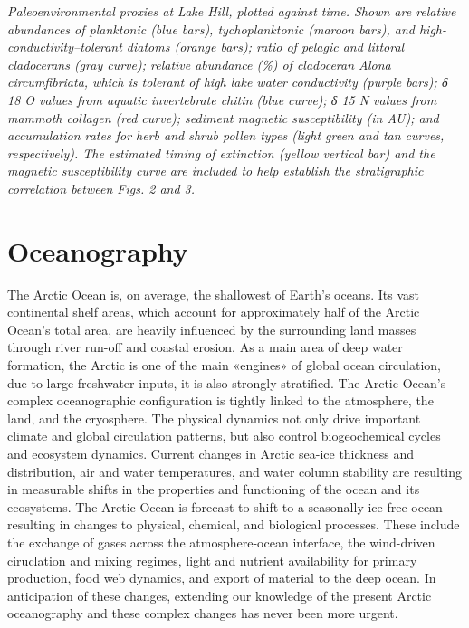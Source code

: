\documentclass[]{book}
\begin{document}
\emph{Paleoenvironmental proxies at Lake Hill, plotted against time. Shown are relative abundances of planktonic (blue bars), tychoplanktonic (maroon bars), and high-conductivity--tolerant diatoms (orange bars); ratio of pelagic and littoral cladocerans (gray curve); relative abundance (\%) of cladoceran Alona circumfibriata, which is tolerant of high lake water conductivity (purple bars); δ 18 O values from aquatic invertebrate chitin (blue curve); δ 15 N values from mammoth collagen (red curve); sediment magnetic susceptibility (in AU); and accumulation rates for herb and shrub pollen types (light green and tan curves, respectively). The estimated timing of extinction (yellow vertical bar) and the magnetic susceptibility curve are included to help establish the stratigraphic correlation between Figs. 2 and 3. }

\hypertarget{flowers}{%
\chapter*{Oceanography}\label{flowers}}

The Arctic Ocean is, on average, the shallowest of Earth's oceans. Its vast continental shelf areas, which account for approximately half of the Arctic Ocean's total area, are heavily influenced by the surrounding land masses through river run-off and coastal erosion. As a main area of deep water formation, the Arctic is one of the main «engines» of global ocean circulation, due to large freshwater inputs, it is also strongly stratified. The Arctic Ocean's complex oceanographic configuration is tightly linked to the atmosphere, the land, and the cryosphere. The physical dynamics not only drive important climate and global circulation patterns, but also control biogeochemical cycles and ecosystem dynamics. Current changes in Arctic sea-ice thickness and distribution, air and water temperatures, and water column stability are resulting in measurable shifts in the properties and functioning of the ocean and its ecosystems. The Arctic Ocean is forecast to shift to a seasonally ice-free ocean resulting in changes to physical, chemical, and biological processes. These include the exchange of gases across the atmosphere-ocean interface, the wind-driven ciruclation and mixing regimes, light and nutrient availability for primary production, food web dynamics, and export of material to the deep ocean. In anticipation of these changes, extending our knowledge of the present Arctic oceanography and these complex changes has never been more urgent.
\end{document}
